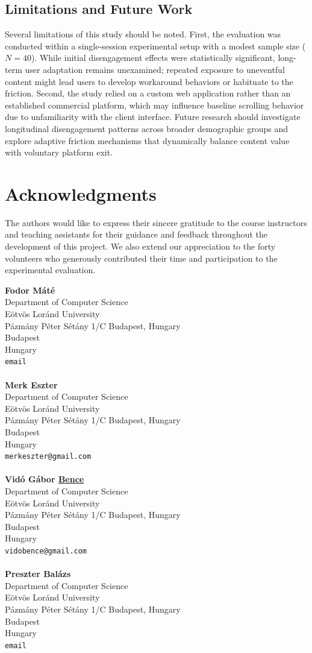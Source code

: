 \documentclass[10pt,leqno,twoside]{article}
\newcommand{\authorblock}[2]{%
  \noindent\textbf{#1}\\
  Department of Computer Science\\Eötvös Loránd University\\
  Pázmány Péter Sétány 1/C Budapest, Hungary\\
  Budapest\\
  Hungary\\
  {\tt #2}\\
  \\
}
\begin{document}
\subsection{Limitations and Future Work}
Several limitations of this study should be noted. First, the evaluation was conducted within a single-session experimental setup with a modest sample size ($N = 40$). While initial disengagement effects were statistically significant, long-term user adaptation remains unexamined; repeated exposure to uneventful content might lead users to develop workaround behaviors or habituate to the friction. Second, the study relied on a custom web application rather than an established commercial platform, which may influence baseline scrolling behavior due to unfamiliarity with the client interface. Future research should investigate longitudinal disengagement patterns across broader demographic groups and explore adaptive friction mechanisms that dynamically balance content value with voluntary platform exit.


\section*{Acknowledgments}
The authors would like to express their sincere gratitude to the course instructors and teaching assistants for their guidance and feedback throughout the development of this project. We also extend our appreciation to the forty volunteers who generously contributed their time and participation to the experimental evaluation.



\printbibliography[title=References]


\clearpage
\vspace{2cm}

\authorblock{Fodor Máté}{email}
\authorblock{Merk Eszter}{merkeszter@gmail.com}
\authorblock{Vidó Gábor \underline{Bence}}{vidobence@gmail.com}
\authorblock{Preszter Balázs}{email}
\end{document}
